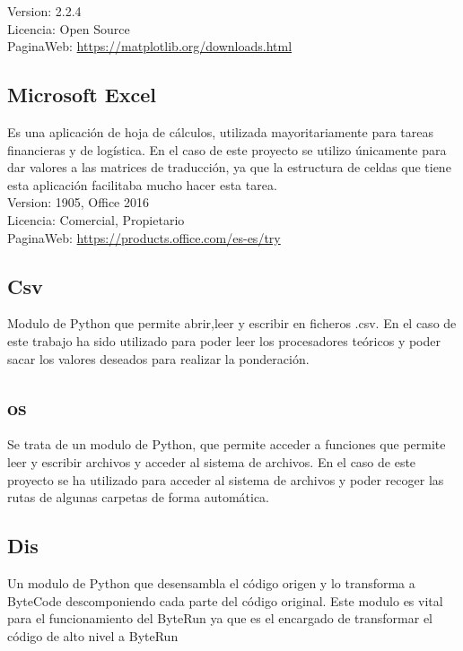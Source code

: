Version: 2.2.4\\
Licencia: Open Source\\
PaginaWeb: \url{https://matplotlib.org/downloads.html}\\


\subsection{Microsoft Excel}
Es una aplicación de hoja de cálculos, utilizada mayoritariamente para tareas financieras y de logística. En el caso de este proyecto se utilizo únicamente para dar valores a las matrices de traducción, ya que la estructura de celdas que tiene esta aplicación facilitaba mucho hacer esta tarea.\\

Version: 1905, Office 2016 \\
Licencia: Comercial, Propietario \\
PaginaWeb: \url{https://products.office.com/es-es/try} \\

\subsection{Csv}

Modulo de Python que permite abrir,leer y escribir en ficheros .csv. En el caso de este trabajo ha sido utilizado para poder leer los procesadores teóricos y poder sacar los valores deseados para realizar la ponderación.
 
\subsection{os}
Se trata de un modulo de Python, que permite acceder a funciones que permite leer y escribir archivos y acceder al sistema de archivos. En el caso de este proyecto se ha utilizado para acceder al sistema de archivos y poder recoger las rutas de algunas carpetas de forma automática. 

\subsection{Dis}
Un modulo de Python que desensambla el código origen y lo transforma a ByteCode descomponiendo cada parte del código original. Este modulo es vital para el funcionamiento del ByteRun ya que es el encargado de transformar el código de alto nivel a ByteRun



